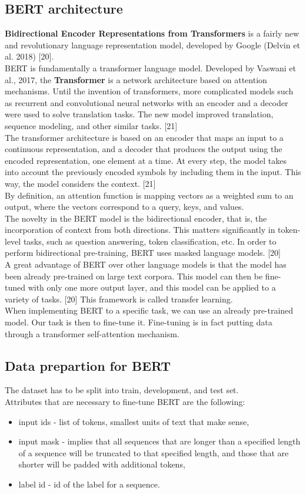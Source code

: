 \documentclass[times, utf8, zavrsni, english]{fer}
\begin{document}
\subsection{BERT architecture}
\textbf{Bidirectional Encoder Representations from Transformers} is a fairly new and revolutionary language representation model, developed by Google (Delvin et al. 2018) [20]. \\
BERT is fundamentally a transformer language model.
Developed by Vaswani et al., 2017, the \textbf{Transformer} is a network architecture based on attention mechanisms. Until the invention of transformers, more complicated models such as recurrent and convolutional neural networks with an encoder and a decoder were used to solve translation tasks. The new model improved translation, sequence modeling, and other similar tasks. [21] \\
The transformer architecture is based on an encoder that maps an input to a continuous representation, and a decoder that produces the output using the encoded representation, one element at a time. At every step, the model takes into account the previously encoded symbols by including them in the input. This way, the model considers the context. [21] \\
By definition, an attention function is mapping vectors as a weighted sum to an output, where the vectors correspond to a query, keys, and values. \\
The novelty in the BERT model is the bidirectional encoder, that is, the incorporation of context from both directions. This matters significantly in token-level tasks, such as question answering, token classification, etc. In order to perform bidirectional pre-training, BERT uses masked language models. [20] \\
A great advantage of BERT over other language models is that the model has been already pre-trained on large text corpora. This model can then be fine-tuned with only one more output layer, and this model can be applied to a variety of tasks. [20] This framework is called transfer learning. \\
When implementing BERT to a specific task, we can use an already pre-trained model. Our task is then to fine-tune it.
Fine-tuning is in fact putting data through a transformer self-attention mechanism.
\subsection{Data prepartion for BERT}
The dataset has to be split into train, development, and test set.\\
Attributes that are necessary to fine-tune BERT are the following:
\begin{itemize}
	\item input ids - list of tokens, smallest units of text that make sense,
	\item  input mask - implies that all sequences that are longer than a specified length of a sequence will be truncated to that specified length, and those that are shorter will be padded with additional tokens,
	\item label id - id of the label for a sequence.
\end{itemize}
 
\end{document}
